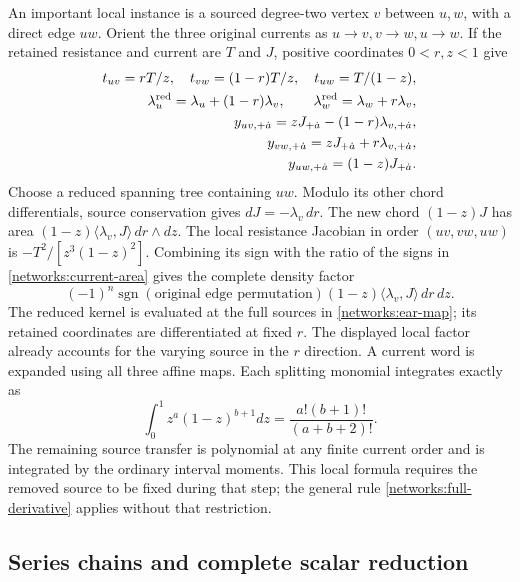 An important local instance is a sourced degree-two vertex $v$ between
$u,w$, with a direct edge $uw$.  Orient the three original currents as
$u\to v,v\to w,u\to w$.  If the retained resistance and current are
$T$ and $J$, positive coordinates $0<r,z<1$ give
\begin{align}
 t_{uv}=rT/z,\quad t_{vw}=(1-r)T/z,\quad t_{uw}=T/(1-z),\\
 \lambda_u^{\rm red}=\lambda_u+(1-r)\lambda_v,\qquad
 \lambda_w^{\rm red}=\lambda_w+r\lambda_v,\\
 y_{uv,+\dot a}=zJ_{+\dot a}-(1-r)\lambda_{v,+\dot a},\\
 y_{vw,+\dot a}=zJ_{+\dot a}+r\lambda_{v,+\dot a},\\
 y_{uw,+\dot a}=(1-z)J_{+\dot a}.
 \label{networks:ear-map}
\end{align}
Choose a reduced spanning tree containing $uw$.  Modulo its other chord
differentials, source conservation gives $dJ=-\lambda_v\,dr$.
The new chord $(1-z)J$ has area
$(1-z)\langle\lambda_v,J\rangle\,dr\wedge dz$.
The local resistance Jacobian in order $(uv,vw,uw)$ is
$-T^2/[z^3(1-z)^2]$.  Combining its sign with the ratio of the signs in
\eqref{networks:current-area} gives the complete density factor
\begin{equation}
 (-1)^n\operatorname{sgn}(\text{original edge permutation})
 (1-z)\langle\lambda_v,J\rangle\,dr\,dz.
 \label{networks:ear-density}
\end{equation}
The reduced kernel is evaluated at the full sources in
\eqref{networks:ear-map}; its retained coordinates are differentiated at
fixed $r$.  The displayed local factor already accounts for the varying
source in the $r$ direction.  A current word is expanded using all three
affine maps.  Each splitting monomial integrates exactly as
\begin{equation}
 \int_0^1 z^a(1-z)^{b+1}dz=\frac{a!(b+1)!}{(a+b+2)!}.
 \label{networks:ear-beta}
\end{equation}
The remaining source transfer is polynomial at any finite current order
and is integrated by the ordinary interval moments.  This local formula
requires the removed source to be fixed during that step; the general
rule \eqref{networks:full-derivative} applies without that restriction.

\subsection{Series chains and complete scalar reduction}
\label{networks:chains}

